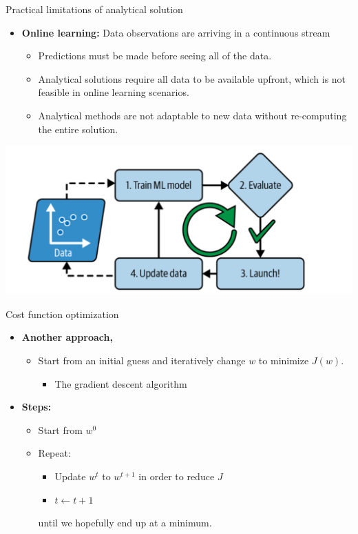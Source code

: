 \documentclass[serif, aspectratio=169]{beamer}
\begin{document}
\begin{frame}{Practical limitations of analytical solution}

    \begin{itemize}
        \item \textbf{Online learning:} Data observations are arriving in a continuous stream
        \begin{itemize}
            \item Predictions must be made before seeing all of the data.
            \item Analytical solutions require all data to be available upfront, which is not feasible in online learning scenarios.
            \item Analytical methods are not adaptable to new data without re-computing the entire solution.
        \end{itemize}
    \end{itemize}

    \centering
    \includegraphics[width=0.6\linewidth]{pic/online-learning.png}

\end{frame}


\begin{frame}{Cost function optimization}

\begin{itemize}
    \item \textbf{Another approach,}
    \begin{itemize}
        \item Start from an initial guess and iteratively change \( w \) to minimize \( J(w) \).
        \begin{itemize}
            \item The gradient descent algorithm
        \end{itemize}
    \end{itemize}

    \item \textbf{Steps:}
    \begin{itemize}
        \item Start from \( w^0 \)
        \item Repeat:
        \begin{itemize}
            \item Update \( w^t \) to \( w^{t+1} \) in order to reduce \( J \)
            \item \( t \leftarrow t + 1 \)
        \end{itemize}
        until we hopefully end up at a minimum.
    \end{itemize}
\end{itemize}

\end{frame}
\end{document}

